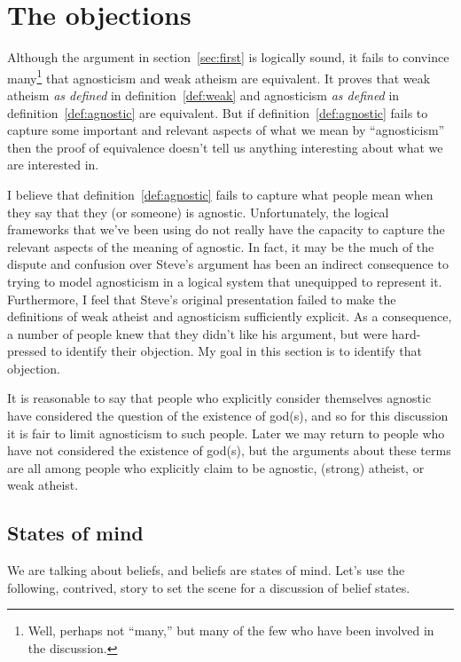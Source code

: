 \documentclass[12pt]{article}
\begin{document}
\section{The objections}\label{sec:object}

Although the argument in section~\ref{sec:first} is logically sound, it fails to convince many\footnote{Well, perhaps not “many,” but many of the few who have been involved in the discussion.}
that agnosticism and weak atheism are equivalent.
It proves that weak atheism \emph{as defined} in definition~\ref{def:weak}
and agnosticism \emph{as defined} in definition~\ref{def:agnostic} are equivalent.
But if definition~\ref{def:agnostic} fails to capture some important and relevant aspects of what we mean by “agnosticism” then the proof of equivalence doesn't tell us anything interesting about what we are interested in.

I believe that definition~\ref{def:agnostic} fails to capture what people mean when they say that they (or someone) is agnostic.
Unfortunately, the logical frameworks that we've been using do not really have the capacity to capture the relevant aspects of the meaning of agnostic.
In fact, it may be the much of the dispute and confusion over Steve's argument has been an indirect consequence to trying to model agnosticism in a logical system that unequipped to represent it.
Furthermore, I feel that Steve's original presentation failed to make the definitions of weak atheist and agnosticism sufficiently explicit.
As a consequence, a number of people knew that they didn't like his argument, but were hard-pressed to identify their objection.
My goal in this section is to identify that objection. 

It is reasonable to say that people who explicitly consider themselves agnostic have considered the question of the existence of god(s), and so for this discussion it is fair to limit agnosticism to such people.
Later we may return to people who have not considered the existence of god(s), but the arguments about these terms are all among people who explicitly claim to be agnostic, (strong) atheist, or weak atheist.

\subsection{States of mind}

We are talking about beliefs, and beliefs are states of mind.
Let's use the following, contrived, story to set the scene for a discussion of belief states.
\end{document}
